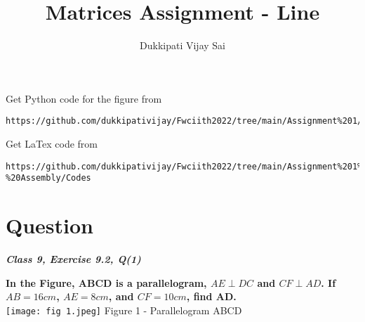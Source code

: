 \documentclass[journal,12pt,twocolumn]{IEEEtran}
\begin{document}
\makeatother
\let\StandardTheFigure\thefigure
\let\vec\mathbf
\renewcommand{\thefigure}{\theproblem}
\def\putbox#1#2#3{\makebox[0in][l]{\makebox[#1][l]{}\raisebox{\baselineskip}[0in][0in]{\raisebox{#2}[0in][0in]{#3}}}}
     \def\rightbox#1{\makebox[0in][r]{#1}}
     \def\centbox#1{\makebox[0in]{#1}}
     \def\topbox#1{\raisebox{-\baselineskip}[0in][0in]{#1}}
     \def\midbox#1{\raisebox{-0.5\baselineskip}[0in][0in]{#1}}
\vspace{3cm}
\title{\textbf{Matrices Assignment - Line} }
\author{Dukkipati Vijay Sai}
\maketitle
\newpage
\bigskip
\renewcommand{\thefigure}{\theenumi}
\renewcommand{\thetable}{\theenumi}
Get Python code for the figure from 
\begin{lstlisting}
https://github.com/dukkipativijay/Fwciith2022/tree/main/Assignment%201/Codes/src
\end{lstlisting}
Get LaTex code from
\begin{lstlisting}
https://github.com/dukkipativijay/Fwciith2022/tree/main/Assignment%201%20-%20Assembly/Codes
\end{lstlisting}
%
\section{Question}
\centering
\textbf{\textit{Class 9, Exercise 9.2, Q(1)}}\\
\vspace{0.25cm}
\raggedright
\textbf{In the Figure, ABCD is a parallelogram, $AE \perp DC$ and $CF \perp AD$. If $AB = 16 cm$, $AE = 8 cm$, and $CF = 10cm$, find AD.} \\
\centering
\texttt{[image: fig 1.jpeg]}
Figure 1 - Parallelogram ABCD
\end{document}
